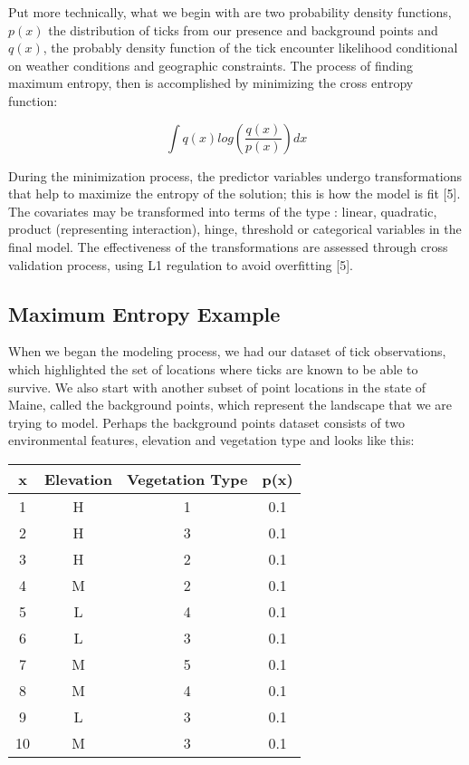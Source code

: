 \noindent Put more technically, what we begin with are two probability density functions, $p(x)$ the distribution of ticks from our presence and background points and $q(x)$, the probably density function of the tick encounter likelihood conditional on weather conditions and geographic constraints. The process of finding maximum entropy, then is  accomplished by minimizing the cross entropy function:  \newline

\begin{equation}
\int q(x)log(\frac{q(x)}{p(x)}) dx
\end{equation}


\noindent  During the minimization process, the predictor variables undergo transformations that help to maximize the entropy of the solution; this is how the model is fit [5]. The covariates may be transformed into terms of the type : linear, quadratic, product (representing interaction), hinge, threshold or categorical variables in the final model. The effectiveness of the transformations are assessed through cross validation process, using L1 regulation to avoid overfitting [5].  \newline


\subsection{Maximum Entropy Example}

\noindent When we began the modeling process, we had our dataset of tick observations, which highlighted the set of locations where ticks are known to be able to survive. We also start with another subset of point locations in the state of Maine, called the background points, which represent the landscape that we are trying to model. Perhaps the background points dataset consists of two environmental features, elevation and vegetation type and looks like this: 

\begin{center}
 \begin{tabular}{||c c c c||} 
 \hline
 x & Elevation & Vegetation Type & p(x) \\ [0.5ex] 
 \hline\hline
 1 & H &  1& 0.1  \\ 
 \hline
  2 & H & 3 & 0.1\\
 \hline
   3 & H & 2 & 0.1\\
 \hline
 4 & M & 2 & 0.1  \\
 \hline
  5 & L & 4 & 0.1 \\
 \hline
   6 & L & 3 & 0.1\\
 \hline
  7 & M & 5 & 0.1 \\
 \hline
   8 & M & 4 & 0.1\\
 \hline
 9 & L & 3 & 0.1 \\
 \hline
   10 & M & 3 & 0.1\\
 \hline
\end{tabular}
\end{center}


